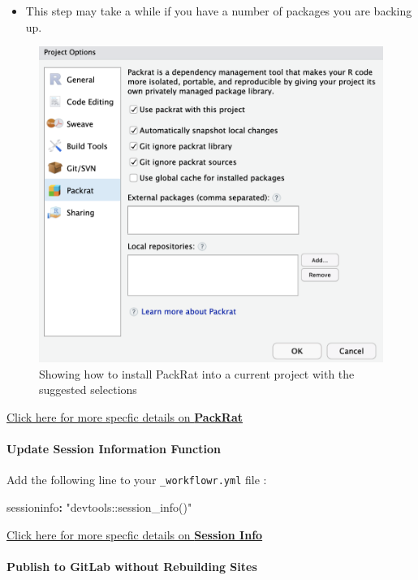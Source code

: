 \documentclass[openany]{book}
\newenvironment{Shaded}{\begin{snugshade}}{\end{snugshade}}
\newcommand{\NormalTok}[1]{#1}
\newcommand{\OperatorTok}[1]{\textcolor[rgb]{0.81,0.36,0.00}{\textbf{#1}}}
\newcommand{\StringTok}[1]{\textcolor[rgb]{0.31,0.60,0.02}{#1}}
\providecommand{\tightlist}{%
  \setlength{\itemsep}{0pt}\setlength{\parskip}{0pt}}
\let\oldparagraph\paragraph
\renewcommand{\paragraph}[1]{\oldparagraph{#1}\mbox{}}
\begin{document}
\begin{itemize}
\tightlist
\item
  This step may take a while if you have a number of packages you are backing up.
\end{itemize}

\begin{figure}

{\centering \includegraphics[width=0.6\linewidth]{images/Workflow_Photos/packRat} 

}

\caption{Showing how to install PackRat into a current project with the suggested selections}\label{fig:c999}
\end{figure}

\protect\hyperlink{adding-packrat-1}{Click here for more specfic details on \textbf{PackRat}}

\hypertarget{update-session-information-function}{%
\paragraph{Update Session Information Function}\label{update-session-information-function}}

Add the following line to your \texttt{\_workflowr.yml} file :

\begin{Shaded}
\begin{Highlighting}[]
\NormalTok{sessioninfo}\OperatorTok{:}\StringTok{ "devtools::session_info()"}
\end{Highlighting}
\end{Shaded}

\protect\hyperlink{update-session-information-function-1}{Click here for more specfic details on \textbf{Session Info}}

\hypertarget{publish-to-gitlab-without-rebuilding-sites}{%
\paragraph{Publish to GitLab without Rebuilding Sites}\label{publish-to-gitlab-without-rebuilding-sites}}
\end{document}
